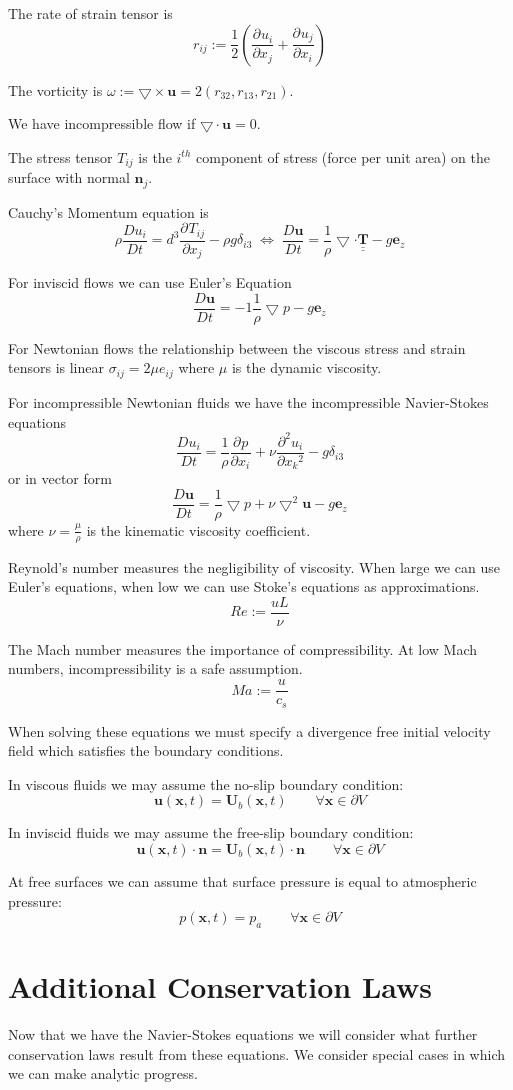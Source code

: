 \documentclass[11pt]{article}
\newcommand*{\pd}[3][]{\ensuremath{\frac{\partial^{#1} {#2}}{\partial {#3}^{#1}}}}
\newcommand*{\md}[1]{\ensuremath{\frac{D #1}{D t}}}
\newcommand{\grad}{\bigtriangledown}
\newcommand{\defeq}{:=}
\newcommand{\tul}[1]{\underline{\underline{#1}}}
\newcommand{\mv}[1]{\bm{#1}}
\newcommand{\mdf}[1]{{\color{red}#1}}
\begin{document}
The \mdf{rate of strain tensor} is 
$$r_{ij}\defeq\frac{1}{2}\left(\pd{u_i}{x_j}+\pd{u_j}{x_i}\right)$$

The \mdf{vorticity} is $\omega\defeq\grad\times\mv{u}=2(r_{32},r_{13},r_{21})$.

We have \mdf{incompressible flow if} $\grad\cdot\mv{u}=0$.

The \mdf{stress tensor} $T_{ij}$ is the $i^{th}$ component of stress (force per unit area) on the surface with normal $\mv{n}_j$.

\mdf{Cauchy's Momentum equation} is
$$\rho\md{u_i}=d^3\pd{T_{ij}}{x_j}-\rho g\delta_{i3}\;\iff\;\md{\mv{u}}=\frac{1}{\rho}\grad\cdot\tul{\mv{T}}-g\mv{e}_z$$

For inviscid flows we can use \mdf{Euler's Equation}
$$\md{\mv{u}}=-1\frac{1}{\rho}\grad p-g\mv{e}_z$$

For Newtonian flows the relationship between the viscous stress and strain tensors is linear $\sigma_{ij}=2\mu e_{ij}$ where $\mu$ is the dynamic viscosity.

For incompressible Newtonian fluids we have the \mdf{incompressible Navier-Stokes equations}
$$\md{u_i}=\frac{1}{\rho}\pd{p}{x_i}+\nu\pd[2]{u_i}{x_k}-g\delta_{i3}$$
or in vector form
$$\md{\mv{u}}=\frac{1}{\rho}\grad p + \nu \grad^2\mv{u} - g\mv{e}_z$$
where $\nu=\frac{\mu}{\rho}$ is the \mdf{kinematic viscosity coefficient}.

\mdf{Reynold's number} measures the negligibility of viscosity. When large we can use Euler's equations, when low we can use Stoke's equations as approximations.
$$Re\defeq\frac{uL}{\nu}$$

The \mdf{Mach number} measures the importance of compressibility. At low Mach numbers, incompressibility is a safe assumption.
$$Ma\defeq\frac{u}{c_s}$$

When solving these equations we must specify a divergence free \mdf{initial velocity field} which satisfies the boundary conditions.

In viscous fluids we may assume the \mdf{no-slip boundary condition}:
$$\mv{u}(\mv{x},t)=\mv{U}_b(\mv{x},t)\quad\quad\forall\mv{x}\in\partial V$$

In inviscid fluids we may assume the \mdf{free-slip boundary condition}:
$$\mv{u}(\mv{x},t)\cdot\mv{n}=\mv{U}_b(\mv{x},t)\cdot\mv{n}\quad\quad\forall\mv{x}\in\partial V$$

At free surfaces we can assume that surface pressure is equal to atmospheric pressure:
$$p(\mv{x},t)=p_a\quad\quad\forall\mv{x}\in\partial V$$
\section{Additional Conservation Laws}
Now that we have the Navier-Stokes equations we will consider what further conservation laws result from these equations. We consider special cases in which we can make analytic progress.
\end{document}
